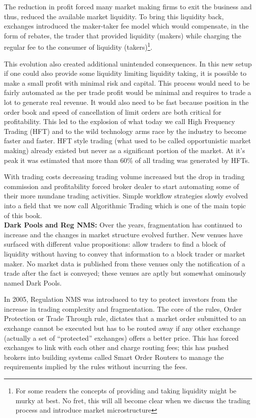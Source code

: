 The reduction in profit forced many market making firms to exit the business and thus, reduced the  available market liquidity. To bring this liquidity back, exchanges introduced the maker-taker fee model which would compensate, in the form of rebates, the trader that provided liquidity (makers) while charging the regular fee to the consumer of liquidity (takers)\footnote{For some readers the concepts of providing and taking liquidity might be murky at best. No fret, this will all become clear when we discuss the trading process and introduce market microstructure}.


This evolution also created additional unintended consequences. In this new setup if one could also provide some liquidity limiting liquidity taking, it is possible to make a small profit with minimal risk and capital. This process would need to be fairly automated as the per trade profit would be minimal and requires to trade a lot to generate real revenue. It would also need to be fast because position in the order book and speed of cancellation of limit orders are both critical for profitability. This led to the explosion of what today we call High Frequency Trading (HFT) and to the wild technology arms race by the industry to become faster and faster. HFT style trading (what used to be called opportunistic market making) already existed but never as a significant portion of the market. At it's peak it was estimated that more than 60\% of all trading was generated by HFTs.


With trading costs decreasing trading volume increased but the drop in trading commission and profitability forced broker dealer to start automating some of their more mundane trading activities. Simple workflow strategies slowly evolved into a field that we now call Algorithmic Trading which is one of the main topic of this book. \\


\noindent\textbf{Dark Pools and Reg NMS:} Over the years, fragmentation has continued to increase and the changes in market structure evolved further. New venues have surfaced with different value propositions: allow traders to find a block of liquidity without having to convey that information to a block trader or market maker. No market data is published from these venues only the notification of a trade after the fact is conveyed; these venues are aptly but somewhat ominously named Dark Pools.


In 2005, Regulation NMS was introduced to try to protect investors from the increase in trading complexity and fragmentation. The core of the rules, Order Protection or Trade Through rule, dictates that a market order submitted to an exchange cannot be executed but has to be routed away if any other exchange (actually a set of ``protected'' exchanges) offers a better price. This has forced exchanges to link with each other and charge routing fees; this has pushed brokers into building systems called Smart Order Routers to manage the requirements implied by the rules without incurring the fees. \\



